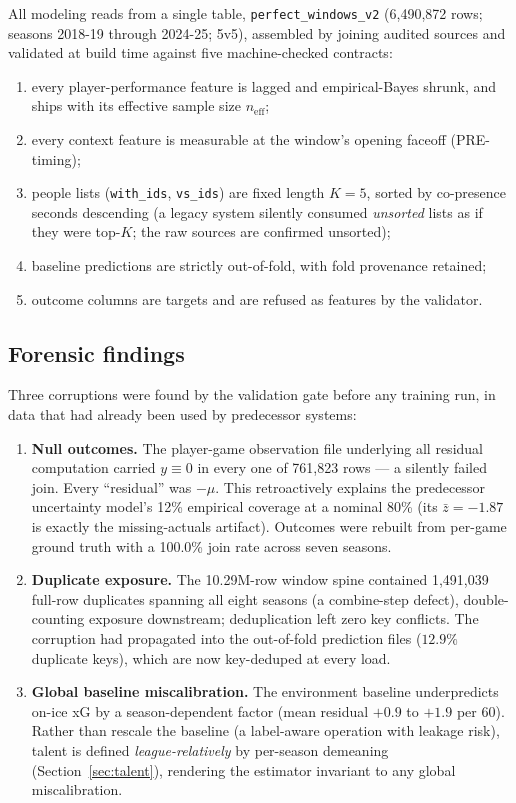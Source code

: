 \documentclass[11pt]{article}
\begin{document}
All modeling reads from a single table, \texttt{perfect\_windows\_v2} (6{,}490{,}872 rows;
seasons 2018-19 through 2024-25; 5v5), assembled by joining audited sources and validated at
build time against five machine-checked contracts:
\begin{enumerate}[nosep]
\item every player-performance feature is lagged and empirical-Bayes shrunk, and ships with
its effective sample size $n_{\mathrm{eff}}$;
\item every context feature is measurable at the window's opening faceoff (PRE-timing);
\item people lists (\texttt{with\_ids}, \texttt{vs\_ids}) are fixed length $K{=}5$, sorted
by co-presence seconds descending (a legacy system silently consumed \emph{unsorted} lists
as if they were top-$K$; the raw sources are confirmed unsorted);
\item baseline predictions are strictly out-of-fold, with fold provenance retained;
\item outcome columns are targets and are refused as features by the validator.
\end{enumerate}

\subsection{Forensic findings}

Three corruptions were found by the validation gate before any training run, in data that
had already been used by predecessor systems:
\begin{enumerate}[nosep]
\item \textbf{Null outcomes.} The player-game observation file underlying all residual
computation carried $y \equiv 0$ in every one of 761{,}823 rows --- a silently failed join.
Every ``residual'' was $-\mu$. This retroactively explains the predecessor uncertainty
model's 12\% empirical coverage at a nominal 80\% (its $\bar z = -1.87$ is exactly the
missing-actuals artifact). Outcomes were rebuilt from per-game ground truth with a 100.0\%
join rate across seven seasons.
\item \textbf{Duplicate exposure.} The 10.29M-row window spine contained 1{,}491{,}039
full-row duplicates spanning all eight seasons (a combine-step defect), double-counting
exposure downstream; deduplication left zero key conflicts. The corruption had propagated
into the out-of-fold prediction files ($12.9\%$ duplicate keys), which are now key-deduped
at every load.
\item \textbf{Global baseline miscalibration.} The environment baseline underpredicts
on-ice xG by a season-dependent factor (mean residual $+0.9$ to $+1.9$ per 60). Rather than
rescale the baseline (a label-aware operation with leakage risk), talent is defined
\emph{league-relatively} by per-season demeaning (Section~\ref{sec:talent}), rendering the
estimator invariant to any global miscalibration.
\end{enumerate}
\end{document}
